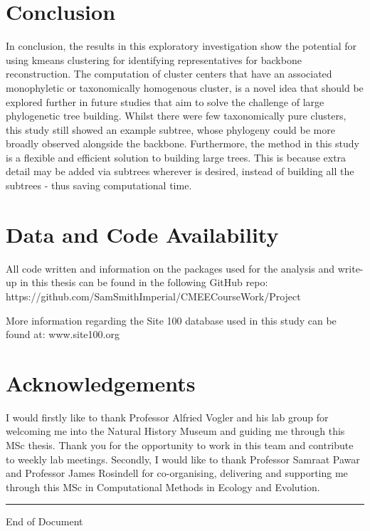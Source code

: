 \documentclass[12pt]{article}
\begin{document}
  \section{Conclusion}

  In conclusion, the results in this exploratory investigation show the potential for using kmeans clustering for identifying representatives for backbone reconstruction. The computation of cluster centers that have an associated monophyletic or taxonomically homogenous cluster, is a novel idea that should be explored further in future studies that aim to solve the challenge of large phylogenetic tree building. Whilst there were few taxonomically pure clusters, this study still showed an example subtree, whose phylogeny could be more broadly observed alongside the backbone. Furthermore, the method in this study is a flexible and efficient solution to building large trees. This is because extra detail may be added via subtrees wherever is desired, instead of building all the subtrees - thus saving computational time. 

  \section{Data and Code Availability}

  All code written and information on the packages used for the analysis and write-up in this thesis can be found in the following GitHub repo: \\
  https://github.com/SamSmithImperial/CMEECourseWork/Project

  More information regarding the Site 100 database used in this study can be found at: www.site100.org

  \section{Acknowledgements}

  I would firstly like to thank Professor Alfried Vogler and his lab group for welcoming me into the Natural History Museum and guiding me through this MSc thesis. Thank you for the opportunity to work in this team and contribute to weekly lab meetings. Secondly, I would like to thank Professor Samraat Pawar and Professor James Rosindell for co-organising, delivering and supporting me through this MSc in Computational Methods in Ecology and Evolution.

  
  
  

  \rule{\linewidth}{0.1mm}
  \begin{center}
    End of Document
  \end{center}
\end{document}
